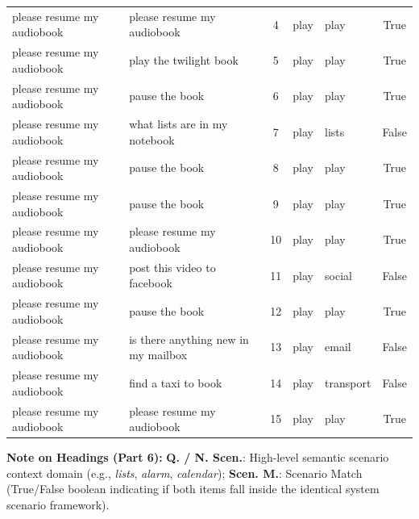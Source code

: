 {\begin{longtable}{p{4.0cm} p{4.0cm} c ll c}
please resume my audiobook & please resume my audiobook & 4 & play & play & True \\
please resume my audiobook & play the twilight book & 5 & play & play & True \\
please resume my audiobook & pause the book & 6 & play & play & True \\
please resume my audiobook & what lists are in my notebook & 7 & play & lists & False \\
please resume my audiobook & pause the book & 8 & play & play & True \\
please resume my audiobook & pause the book & 9 & play & play & True \\
please resume my audiobook & please resume my audiobook & 10 & play & play & True \\
please resume my audiobook & post this video to facebook & 11 & play & social & False \\
please resume my audiobook & pause the book & 12 & play & play & True \\
please resume my audiobook & is there anything new in my mailbox & 13 & play & email & False \\
please resume my audiobook & find a taxi to book & 14 & play & transport & False \\
please resume my audiobook & please resume my audiobook & 15 & play & play & True \\
\bottomrule
\end{longtable}
}
\vspace{0.1cm}
{\footnotesize\noindent\raggedright \textbf{Note on Headings (Part 6):} \textbf{Q. / N. Scen.}: High-level semantic scenario context domain (e.g., \textit{lists}, \textit{alarm}, \textit{calendar}); \textbf{Scen. M.}: Scenario Match (True/False boolean indicating if both items fall inside the identical system scenario framework).\par}

